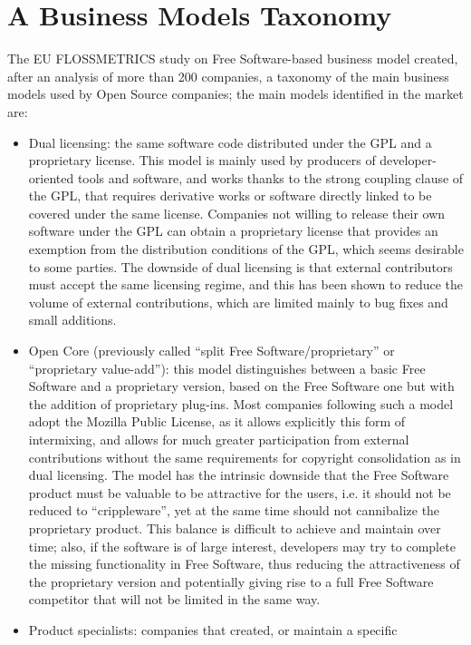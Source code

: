 \section*{A Business Models Taxonomy}

The EU FLOSSMETRICS study on Free Software-based business model created, after
an analysis of more than 200 companies, a taxonomy of the main business models
used by Open Source companies; the main models identified in the market are: 
\begin{itemize}
 \item Dual licensing: the same software code distributed under the GPL and a
proprietary license. This model is mainly used by producers of
developer-oriented tools and software, and works thanks to the strong coupling
clause of the GPL, that requires derivative works or software directly linked to
be covered under the same license. Companies not willing to release their own
software under the GPL can obtain a proprietary license that provides an
exemption from the distribution conditions of the GPL, which seems desirable to
some parties. The downside of dual licensing is that external contributors must
accept the same licensing regime, and this has been shown to reduce the volume
of external contributions, which are limited mainly to bug fixes and small
additions.
 \item Open Core (previously called ``split Free Software/proprietary'' or
``proprietary value-add''): this model distinguishes between a basic Free Software
and a proprietary version, based on the Free Software one but with the addition
of proprietary plug-ins. Most companies following such a model adopt the Mozilla
Public License, as it allows explicitly this form of intermixing, and allows for
much greater participation from external contributions without the same
requirements for copyright consolidation as in dual licensing. The model has the
intrinsic downside that the Free Software product must be valuable to be
attractive for the users, i.e. it should not be reduced to ``crippleware'', yet at
the same time should not cannibalize the proprietary product. This balance is
difficult to achieve and maintain over time; also, if the software is of large
interest, developers may try to complete the missing functionality in Free
Software, thus reducing the attractiveness of the proprietary version and
potentially giving rise to a full Free Software competitor that will not be
limited in the same way.
 \item Product specialists: companies that created, or maintain a specific

\end{itemize}
